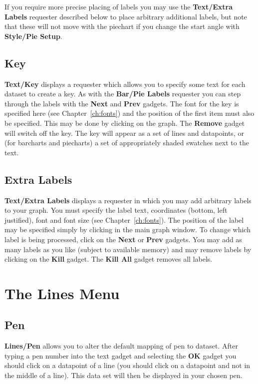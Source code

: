 If you require more precise placing of labels you may use the {\bf Text/Extra Labels}
requester described below to place arbitrary additional labels, but note that these 
will not move with the piechart if you change the start angle with {\bf Style/Pie 
Setup}.


\subsection{Key}
{\bf Text/Key} displays a requester which allows you to specify 
some text for 
each dataset to create a key. As with the {\bf Bar/Pie Labels} requester you can 
step through the labels with the {\bf Next} and {\bf Prev} gadgets. The font for 
the key is specified here (see Chapter~\ref{ch:fonts}) and the position of the 
first item must also be specified.
This may be done by clicking on the graph. The {\bf Remove} gadget will switch off 
the key. The key will appear as a set of lines and datapoints, or (for barcharts 
and piecharts) a set of appropriately shaded swatches next to the text.


\subsection{Extra Labels}
\label{ss:linlab}
{\bf Text/Extra Labels}  displays a requester in which you may 
add arbitrary labels to your graph.
You must specify the label text, coordinates (bottom, left justified), 
font and font size (see Chapter~\ref{ch:fonts}).
The position of the label may be specified simply by clicking in the main graph 
window.
To change which label is being processed, click on the {\bf Next} or {\bf Prev}
gadgets. You may add as many labels as you like (subject to available memory) and 
may remove labels by clicking on the {\bf Kill} gadget. The {\bf Kill All} gadget 
removes all labels.



\section{The Lines Menu}


\subsection{Pen}
\label{ss:pen}
{\bf Lines/Pen}  allows you to alter the default mapping of pen to 
dataset. After typing a
pen number into the text gadget and selecting the {\bf OK} gadget you should click
on a datapoint of a line (you should click on a datapoint 
and not in the middle of a line). This data set will then be displayed in your chosen 
pen.


